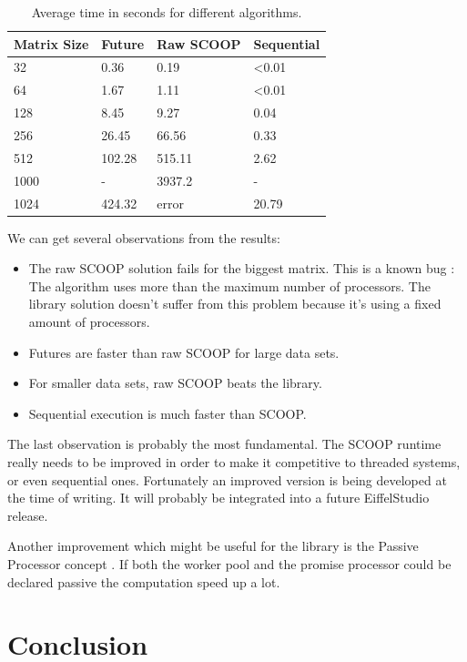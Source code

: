 \documentclass[a4paper,10pt]{article}
\begin{document}
\begin{table} [!h]
\centering
\begin{tabular}{|l|l l l|} 
\hline
Matrix Size & Future & Raw SCOOP & Sequential\\
\hline
32 & 0.36 & 0.19 &  \textless 0.01\\
64 & 1.67 & 1.11 & \textless 0.01\\
128 & 8.45 & 9.27 & 0.04\\
256 & 26.45 & 66.56 & 0.33\\
512 & 102.28 & 515.11 & 2.62\\
1000 & - &  3937.2 & - \\
1024 & 424.32 & error & 20.79 \\
\hline
\end{tabular}
\caption{Average time in seconds for different algorithms.}
\label{table:perf-results}
\end{table}


We can get several observations from the results:

\begin{itemize}
 \item The raw SCOOP solution fails for the biggest matrix.
 This is a known bug \cite{web:scoop-issues}:
 The algorithm uses more than the maximum number of processors.
 The library solution doesn't suffer from this problem because it's using a fixed amount of processors.
 \item Futures are faster than raw SCOOP for large data sets.
 \item For smaller data sets, raw SCOOP beats the library.
 \item Sequential execution is much faster than SCOOP.
\end{itemize}

The last observation is probably the most fundamental.
The SCOOP runtime really needs to be improved in order to make it competitive to threaded systems, or even sequential ones.
Fortunately an improved version \cite{thesis:scottwest} is being developed at the time of writing.
It will probably be integrated into a future EiffelStudio release.

Another improvement which might be useful for the library is the Passive Processor concept \cite{paper:passive-processors}.
If both the worker pool and the promise processor could be declared passive the computation speed up a lot.

\section{Conclusion}
\end{document}
